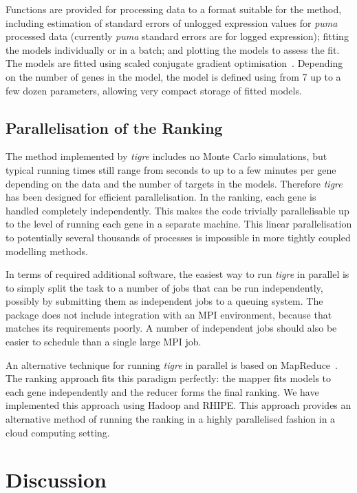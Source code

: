 \documentclass{bioinfo}
\newcommand{\tigre}{\emph{tigre}}
\begin{document}
Functions are provided for processing data to a format suitable for
the method, including estimation of standard errors of unlogged expression
values for \emph{puma} processed data (currently \emph{puma} standard errors are for logged expression); fitting the models individually
or in a batch; and plotting the models to assess the fit.  The models
are fitted using scaled conjugate gradient
optimisation~\citep{Moller:scg93}.  Depending on the number of genes
in the model, the model is defined using from 7 up to a few dozen
parameters, allowing very compact storage of fitted models.

\subsection{Parallelisation of the Ranking}

The method implemented by \tigre{} includes no Monte Carlo simulations,
but typical running times still range from
seconds to up to a few minutes per gene depending on the data and the
number of targets in the models.
Therefore \tigre{} has been designed for efficient parallelisation.  In the
ranking, each gene is handled completely independently.  This makes
the code trivially parallelisable up to the level of running each gene
in a separate machine.  This linear parallelisation to potentially
several thousands of processes is impossible in more tightly coupled
modelling methods.

In terms of required additional software,
the easiest way to run \tigre{} in parallel is to simply split the
task to a number of jobs that can be run independently, possibly by
submitting them as independent jobs to a queuing system.  The package
does not include integration with an MPI environment, because that
matches its requirements poorly.  A number of independent jobs should
also be easier to schedule than a single large MPI job.

An alternative technique for running \tigre{} in parallel is based on
MapReduce~\citep{Dean2008}.  The ranking approach fits this paradigm
perfectly: the mapper fits models to each gene independently and the
reducer forms the final ranking.  We have implemented this approach
using Hadoop and RHIPE.  This approach provides an alternative method
of running the ranking in a highly parallelised fashion in a cloud
computing setting.

\section{Discussion}
\end{document}
